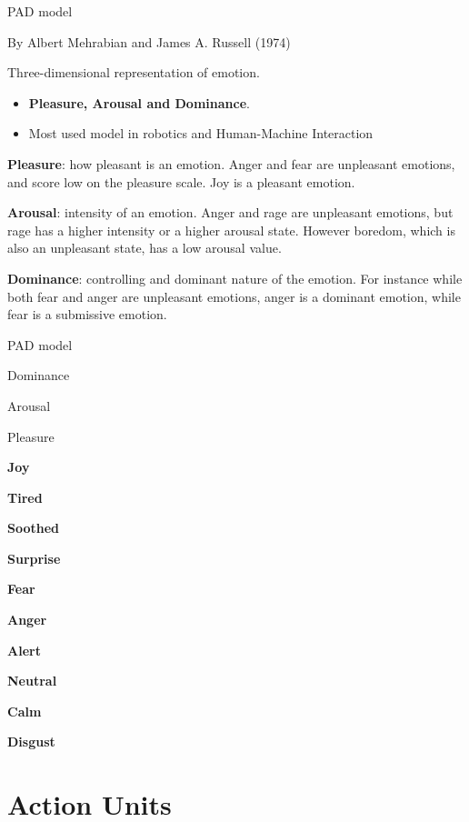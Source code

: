 \documentclass[compress]{beamer}
\begin{document}
\begin{frame}{PAD model}

By Albert Mehrabian and James A. Russell (1974)

Three-dimensional representation of emotion.

\begin{itemize}

\item \textbf{Pleasure, Arousal and Dominance}.
\item Most used model in robotics and Human-Machine Interaction
\end{itemize}

\textbf{Pleasure}: how pleasant is an emotion. Anger and fear are
unpleasant emotions, and score low on the pleasure scale. Joy is a
pleasant emotion.

\textbf{Arousal}: intensity of an emotion. Anger and rage are unpleasant
emotions, but rage has a higher intensity or a higher arousal state.
However boredom, which is also an unpleasant state, has a low arousal
value.

\textbf{Dominance}: controlling and dominant nature of the emotion. For
instance while both fear and anger are unpleasant emotions, anger is a
dominant emotion, while fear is a submissive emotion.

\end{frame}

\begin{frame}{PAD model}

Dominance

Arousal

Pleasure

\textbf{Joy}

\textbf{Tired}

\textbf{Soothed}

\textbf{Surprise}

\textbf{Fear}

\textbf{Anger}

\textbf{Alert}

\textbf{Neutral}

\textbf{Calm}

\textbf{Disgust}

\end{frame}

\section{Action Units}

\newcommand{\au}[1]{
    \texttt{[image: au/au-0\#1.jpg]}
}
\end{document}
